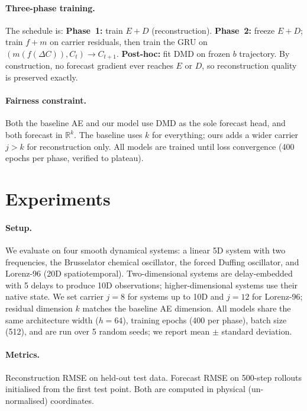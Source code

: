 \documentclass{article}
\begin{document}
\paragraph{Three-phase training.}
The schedule is:
\textbf{Phase~1:} train $E + D$ (reconstruction).
\textbf{Phase~2:} freeze $E + D$; train $f + m$ on carrier residuals, then train
the GRU on $(m(f(\Delta C)), C_t) \to C_{t+1}$.
\textbf{Post-hoc:} fit DMD on frozen $b$ trajectory.
By construction, no forecast gradient ever reaches $E$ or $D$, so
reconstruction quality is preserved exactly.

\paragraph{Fairness constraint.}
Both the baseline AE and our model use DMD as the sole forecast head, and both
forecast in $\mathbb{R}^k$.  The baseline uses $k$ for everything; ours adds a
wider carrier $j > k$ for reconstruction only.  All models are trained until
loss convergence (400 epochs per phase, verified to plateau).


\section{Experiments}

\paragraph{Setup.}
We evaluate on four smooth dynamical systems: a linear 5D system with two
frequencies, the Brusselator chemical oscillator, the forced Duffing
oscillator, and Lorenz-96 (20D spatiotemporal).
Two-dimensional systems are delay-embedded with 5 delays to produce 10D
observations; higher-dimensional systems use their native state.  We set
carrier $j=8$ for systems up to 10D and $j=12$ for Lorenz-96; residual
dimension $k$ matches the baseline AE dimension.
All models share the same architecture width ($h=64$), training epochs
(400 per phase), batch size (512), and are run over 5 random seeds; we report
mean $\pm$ standard deviation.

\paragraph{Metrics.}
Reconstruction RMSE on held-out test data.  Forecast RMSE on 500-step
rollouts initialised from the first test point.  Both are computed in physical
(un-normalised) coordinates.
\end{document}
